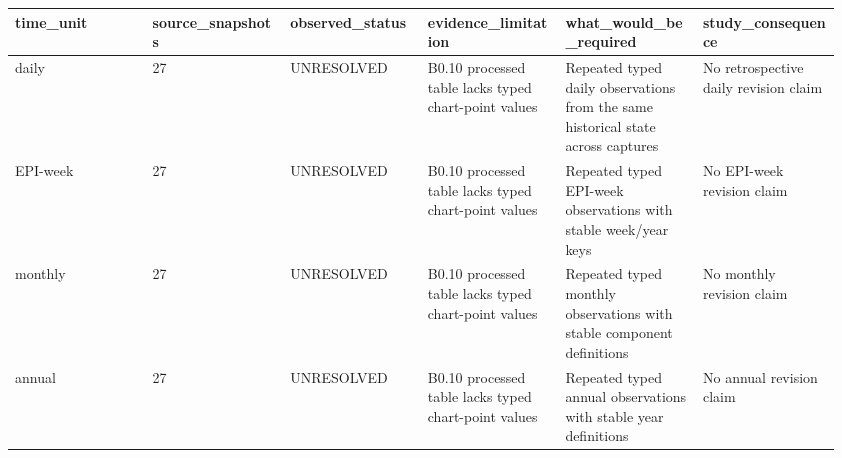 \begingroup\footnotesize\setlength{\tabcolsep}{3pt}\renewcommand{\arraystretch}{1.15}
\begin{longtable}{P{0.1600\linewidth}P{0.1600\linewidth}P{0.1600\linewidth}P{0.1600\linewidth}P{0.1600\linewidth}P{0.1600\linewidth}}
\toprule
time\_unit & source\_snapshots & observed\_status & evidence\_limitation & what\_would\_be\_required & study\_consequence \\
\midrule\endhead
daily & 27 & UNRESOLVED & B0.10 processed table lacks typed chart-point values & Repeated typed daily observations from the same historical state across captures & No retrospective daily revision claim \\
EPI-week & 27 & UNRESOLVED & B0.10 processed table lacks typed chart-point values & Repeated typed EPI-week observations with stable week/year keys & No EPI-week revision claim \\
monthly & 27 & UNRESOLVED & B0.10 processed table lacks typed chart-point values & Repeated typed monthly observations with stable component definitions & No monthly revision claim \\
annual & 27 & UNRESOLVED & B0.10 processed table lacks typed chart-point values & Repeated typed annual observations with stable year definitions & No annual revision claim \\
\bottomrule
\end{longtable}
\endgroup
